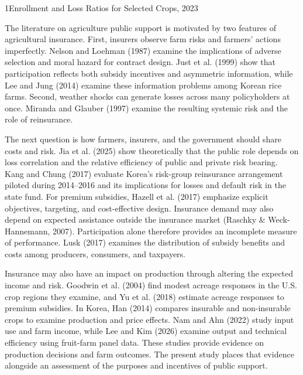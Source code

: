\begin{wordtable}{1}{Enrollment and Loss Ratios for Selected Crops, 2023}

\end{wordtable}


The literature on agriculture public support is motivated by two features of agricultural insurance. First, insurers observe farm risks and farmers' actions imperfectly. Nelson and Loehman (1987) examine the implications of adverse selection and moral hazard for contract design. Just et al. (1999) show that participation reflects both subsidy incentives and asymmetric information, while Lee and Jung (2014) examine these information problems among Korean rice farms. Second, weather shocks can generate losses across many policyholders at once. Miranda and Glauber (1997) examine the resulting systemic risk and the role of reinsurance.

The next question is how farmers, insurers, and the government should share costs and risk. Jia et al. (2025) show theoretically that the public role depends on loss correlation and the relative efficiency of public and private risk bearing. Kang and Chung (2017) evaluate Korea's risk-group reinsurance arrangement piloted during 2014--2016 and its implications for losses and default risk in the state fund. For premium subsidies, Hazell et al. (2017) emphasize explicit objectives, targeting, and cost-effective design. Insurance demand may also depend on expected assistance outside the insurance market (Raschky \& Weck-Hannemann, 2007). Participation alone therefore provides an incomplete measure of performance. Lusk (2017) examines the distribution of subsidy benefits and costs among producers, consumers, and taxpayers.

Insurance may also have an impact on production through altering the expected income and risk. Goodwin et al. (2004) find modest acreage responses in the U.S. crop regions they examine, and Yu et al. (2018) estimate acreage responses to premium subsidies. In Korea, Han (2014) compares insurable and non-insurable crops to examine production and price effects. Nam and Ahn (2022) study input use and farm income, while Lee and Kim (2026) examine output and technical efficiency using fruit-farm panel data. These studies provide evidence on production decisions and farm outcomes. The present study places that evidence alongside an assessment of the purposes and incentives of public support.

